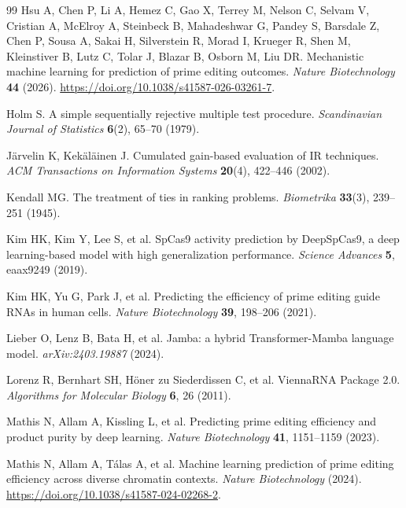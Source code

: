 \documentclass[11pt]{article}
\begin{document}
\begin{thebibliography}{99}
Hsu A, Chen P, Li A, Hemez C, Gao X, Terrey M, Nelson C, Selvam V, Cristian A,
McElroy A, Steinbeck B, Mahadeshwar G, Pandey S, Barsdale Z, Chen P, Sousa A,
Sakai H, Silverstein R, Morad I, Krueger R, Shen M, Kleinstiver B, Lutz C,
Tolar J, Blazar B, Osborn M, Liu DR.
Mechanistic machine learning for prediction of prime editing outcomes.
\emph{Nature Biotechnology} \textbf{44} (2026).
\url{https://doi.org/10.1038/s41587-026-03261-7}.

Holm S.
A simple sequentially rejective multiple test procedure.
\emph{Scandinavian Journal of Statistics} \textbf{6}(2), 65--70 (1979).

J\"arvelin K, Kek\"al\"ainen J.
Cumulated gain-based evaluation of IR techniques.
\emph{ACM Transactions on Information Systems} \textbf{20}(4), 422--446 (2002).

Kendall MG.
The treatment of ties in ranking problems.
\emph{Biometrika} \textbf{33}(3), 239--251 (1945).

Kim HK, Kim Y, Lee S, et al.
SpCas9 activity prediction by DeepSpCas9, a deep learning-based model with high
generalization performance. \emph{Science Advances} \textbf{5}, eaax9249 (2019).

Kim HK, Yu G, Park J, et al.
Predicting the efficiency of prime editing guide RNAs in human cells.
\emph{Nature Biotechnology} \textbf{39}, 198--206 (2021).

Lieber O, Lenz B, Bata H, et al.
Jamba: a hybrid Transformer-Mamba language model. \emph{arXiv:2403.19887} (2024).

Lorenz R, Bernhart SH, H\"oner zu Siederdissen C, et al.
ViennaRNA Package 2.0. \emph{Algorithms for Molecular Biology} \textbf{6}, 26 (2011).

Mathis N, Allam A, Kissling L, et al.
Predicting prime editing efficiency and product purity by deep learning.
\emph{Nature Biotechnology} \textbf{41}, 1151--1159 (2023).

Mathis N, Allam A, Tálas A, et al.
Machine learning prediction of prime editing efficiency across diverse chromatin
contexts. \emph{Nature Biotechnology} (2024).
\url{https://doi.org/10.1038/s41587-024-02268-2}.


\end{thebibliography}
\end{document}
